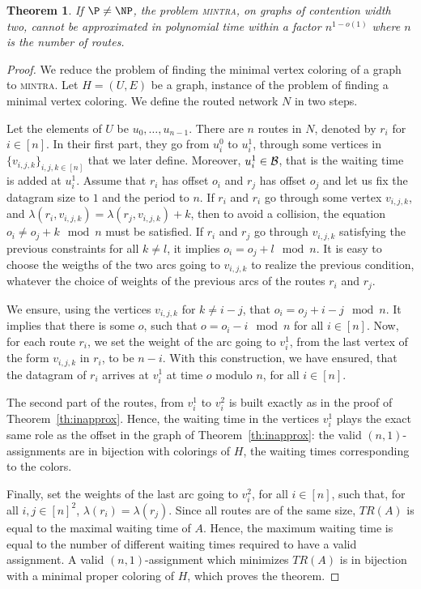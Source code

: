 \documentclass[a4paper,10pt]{article}
\newtheorem{theorem}{Theorem}
\newcommand\mintra{\textsc{mintra}\xspace}
\begin{document}
\begin{theorem}
If $\P \neq \NP$, the problem \mintra, on graphs of contention width two, cannot be approximated in polynomial time within a factor $n^{1-o(1)}$ where $n$ is the number of routes.
\end{theorem}

\begin{proof}
We reduce the problem of finding the minimal vertex coloring of a graph to \mintra.
 Let $H = (U,E)$ be a graph, instance of the problem of finding a minimal vertex coloring. 
 We define the routed network $N$ in two steps. 

 Let the elements of $U$ be $u_0,\dots, u_{n-1}$. There are $n$ routes in $N$, denoted by $r_i$ for $i \in [n]$. In their first part, they go from $u_i^0$ to $u_i^1$, through some vertices in $\{v_{i,j,k}\}_{i,j,k \in [n]}$ that we later define. Moreover, $u_i^1 \in \cal{B}$, that is the waiting time is added at $u_i^1$. Assume that $r_i$ has offset $o_i$ and $r_j$ has offset $o_j$ and let us fix the datagram size to $1$ and the period to $n$. If $r_i$ and $r_i$ go through some vertex $v_{i,j,k}$, and  $\lambda(r_i,v_{i,j,k}) = \lambda(r_j,v_{i,j,k}) + k$, then to avoid a collision, the equation $o_i \neq o_j + k \mod n$ must be satisfied. If $r_i$ and $r_j$ go through $v_{i,j,k}$ satisfying the previous constraints for all $k \neq l$, it implies $o_i = o_j + l \mod n$. 
 It is easy to choose the weigths of the two arcs going to $v_{i,j,k}$ to realize the previous condition, whatever the choice of weights of the previous arcs of the routes $r_i$ and $r_j$.

We ensure, using the vertices $v_{i,j,k}$ for $k \neq i-j$,
that $o_{i} = o_{j} + i - j \mod n$. It implies that there is some $o$, such that 
$ o = o_{i} - i \mod n$ for all $i \in [n]$. Now, for each route $r_i$, we set the weight of the
arc going to $v_i^1$, from the last vertex of the form $v_{i,j,k}$ in $r_i$, to be $n-i$.
With this construction, we have ensured, that the datagram of $r_i$ arrives at 
$v_i^1$ at time $o$ modulo $n$, for all $i \in [n]$. 

The second part of the routes, from $v_i^1$ to $v_i^2$ is built exactly as in the proof of Theorem~\ref{th:inapprox}. Hence, the waiting time in the vertices $v_i^1$ plays the exact same role as the offset
in the graph of Theorem~\ref{th:inapprox}: the valid $(n,1)$-assignments are in bijection with colorings of $H$, the waiting times corresponding to the colors.

Finally, set the weights of the last arc going to $v_i^2$, for all $i \in [n]$, such that, for all $i,j \in [n]^2$, $\lambda(r_i) = \lambda(r_j)$.  Since all routes are of the same size, $TR(A)$ is equal to the maximal waiting time of $A$. Hence, the maximum waiting time is equal to the number of different waiting times required to have a valid assignment. A valid $(n,1)$-assignment which minimizes $TR(A)$ is in bijection with a minimal proper coloring of $H$, which proves the theorem.
\end{proof}
\end{document}
